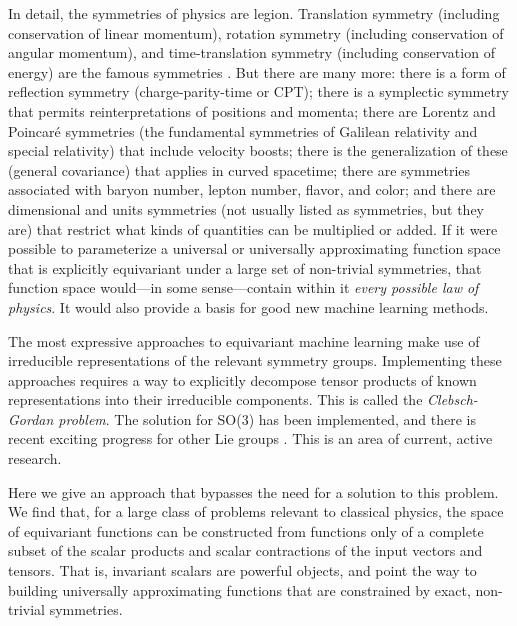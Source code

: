 \documentclass{article}
\theoremstyle{Hogg}
\begin{document}
In detail, the symmetries of physics are legion.
Translation symmetry (including conservation of linear momentum), rotation symmetry (including conservation of angular momentum), and time-translation symmetry (including conservation of energy) are the famous symmetries \cite{noether}.
But there are many more:
there is a form of reflection symmetry (charge-parity-time or CPT);
there is a symplectic symmetry that permits reinterpretations of positions and momenta;
there are Lorentz and Poincar\'e symmetries (the fundamental symmetries of Galilean relativity and special relativity) that include velocity boosts;
there is the generalization of these (general covariance) that applies in curved spacetime;
there are symmetries associated with baryon number, lepton number, flavor, and color;
and there are dimensional and units symmetries (not usually listed as symmetries, but they are) that restrict what kinds of quantities can be multiplied or added.
If it were possible to parameterize a universal or universally approximating function space that is explicitly equivariant under a large set of non-trivial symmetries, that function space would---in some sense---contain within it \emph{every possible law of physics}.
It would also provide a basis for good new machine learning methods.

The most expressive approaches to equivariant machine learning make use of irreducible representations of the relevant symmetry groups. Implementing these approaches requires a way to explicitly decompose tensor products of known representations into their irreducible components. This is called the {\em Clebsch-Gordan problem}. The solution for SO($3$) has been implemented, and there is recent exciting progress for other Lie groups \cite{alex2011numerical, ibort2017new}. This is an area of current, active research.

Here we give an approach that bypasses the need for a solution to this problem.
We find that, for a large class of problems relevant to classical physics, the space of equivariant functions can be constructed from functions only of a complete subset of the scalar products and scalar contractions of the input vectors and tensors.
That is, invariant scalars are powerful objects, and point the way to building universally approximating functions that are constrained by exact, non-trivial symmetries.
\end{document}
